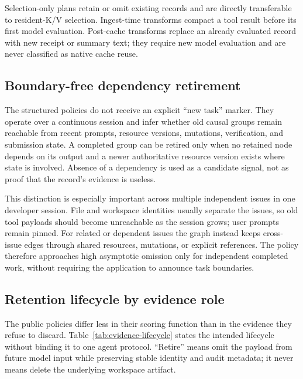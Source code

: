 \documentclass[11pt]{article}
\begin{document}
Selection-only plans retain or omit existing records and are directly
transferable to resident-K/V selection.  Ingest-time transforms compact a tool
result before its first model evaluation.  Post-cache transforms replace an
already evaluated record with new receipt or summary text; they require new
model evaluation and are never classified as native cache reuse.

\subsection{Boundary-free dependency retirement}

The structured policies do not receive an explicit ``new task'' marker.  They
operate over a continuous session and infer whether old causal groups remain
reachable from recent prompts, resource versions, mutations, verification, and
submission state.  A completed group can be retired only when no retained node
depends on its output and a newer authoritative resource version exists where
state is involved.  Absence of a dependency is used as a candidate signal, not
as proof that the record's evidence is useless.

This distinction is especially important across multiple independent issues in
one developer session.  File and workspace identities usually separate the
issues, so old tool payloads should become unreachable as the session grows;
user prompts remain pinned.  For related or dependent issues the graph instead
keeps cross-issue edges through shared resources, mutations, or explicit
references.  The policy therefore approaches high asymptotic omission only for
independent completed work, without requiring the application to announce task
boundaries.

\subsection{Retention lifecycle by evidence role}

The public policies differ less in their scoring function than in the evidence
they refuse to discard.  Table~\ref{tab:evidence-lifecycle} states the intended
lifecycle without binding it to one agent protocol.  ``Retire'' means omit the
payload from future model input while preserving stable identity and audit
metadata; it never means delete the underlying workspace artifact.
\end{document}
